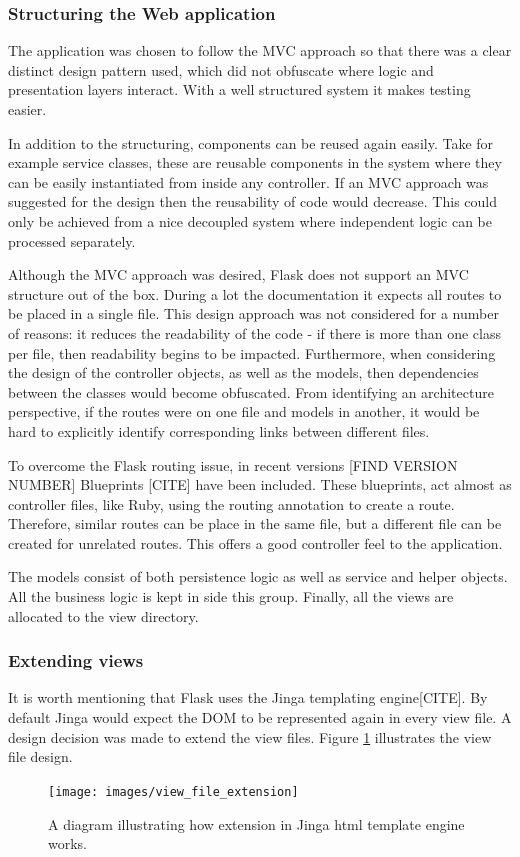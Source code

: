 \subsubsection{Structuring the Web application}
The application was chosen to follow the MVC approach so that there was a clear distinct design pattern used, which did not obfuscate where logic and presentation layers interact. With a well structured system it makes testing easier.

In addition to the structuring, components can be reused again easily. Take for example service classes, these are reusable components in the system where they can be easily instantiated from inside any controller. If an MVC approach was suggested for the design then the reusability of code would decrease. This could only be achieved from a nice decoupled system where independent logic can be processed separately.

Although the MVC approach was desired, Flask does not support an MVC structure out of the box. During a lot the documentation it expects all routes to be placed in a single file. This design approach was not considered for a number of reasons: it reduces the readability of the code - if there is more than one class per file, then readability begins to be impacted. Furthermore, when considering the design of the controller objects, as well as the models, then dependencies between the classes would become obfuscated. From identifying an architecture perspective, if the routes were on one file and models in another, it would be hard to explicitly identify corresponding links between different files.

To overcome the Flask routing issue, in recent versions [FIND VERSION NUMBER] Blueprints [CITE] have been included. These blueprints, act almost as controller files, like Ruby, using the routing annotation to create a route. Therefore, similar routes can be place in the same file, but a different file can be created for unrelated routes. This offers a good controller feel to the application.

The models consist of both persistence logic as well as service and helper objects. All the business logic is kept in side this group. Finally, all the views are allocated to the view directory.

\subsubsection{Extending views}
It is worth mentioning that Flask uses the Jinga templating engine[CITE]. By default Jinga would expect the DOM to be represented again in every view file. A design decision was made to extend the view files. Figure \ref{fig:extension} illustrates the view file design.
\begin{figure}[h]
  \centering
  \texttt{[image: images/view\_file\_extension]}
  \caption{A diagram illustrating how extension in Jinga html template engine works.}
  \label{fig:extension}
\end{figure}

